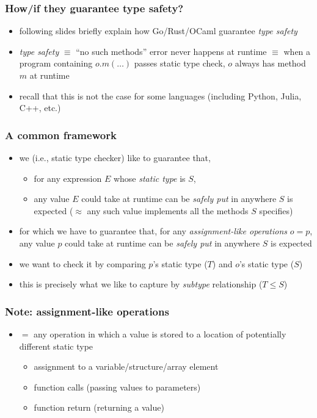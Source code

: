 \documentclass[12pt,dvipdfmx]{beamer}
\newcommand{\ao}[1]{{\color{blue}#1}}
\begin{document}
\begin{frame}
  \frametitle{How/if they guarantee type safety?}
  \begin{itemize}
  \item following slides briefly explain how Go/Rust/OCaml guarantee \ao{\it type safety}
  \item \ao{\it type safety} $\equiv$ ``no such methods'' error never happens at runtime
    $\equiv$ when a program containing $o.m(\ldots)$ passes static type check,
    $o$ always has method $m$ at runtime
  \item recall that this is not the case for some languages (including Python, Julia, C++, etc.)
  \end{itemize}
\end{frame}

\begin{frame}
  \frametitle{A common framework}
  \begin{itemize}
  \item we (i.e., static type checker) like to guarantee that,
    \begin{itemize}
    \item for any expression $E$ whose \ao{\it static type} is $S$,
    \item any value $E$ could take at runtime can be \ao{\it safely put} in anywhere $S$ is expected
      ($\approx$ any such value implements all the methods $S$ specifies)
    \end{itemize}
  \item for which we have to guarantee that,
    for any \ao{\it assignment-like operations} $o = p$,
    any value $p$ could take at runtime can be \ao{\it safely put} in anywhere $S$ is expected
  \item we want to check it by comparing $p$'s static type ($T$) and $o$'s static type ($S$)
  \item this is precisely what we like to capture by
    \ao{\it subtype} relationship ($T \leq S$)
  \end{itemize}
\end{frame}
    
\begin{frame}
  \frametitle{Note: assignment-like operations}
  \begin{itemize}
  \item  $=$ any operation in which a value is
    stored to a location of potentially different static type
    \begin{itemize}
    \item assignment to a variable/structure/array element
    \item function calls (passing values to parameters)
    \item function return (returning a value)
    \end{itemize}
  \end{itemize}
\end{frame}
\end{document}
